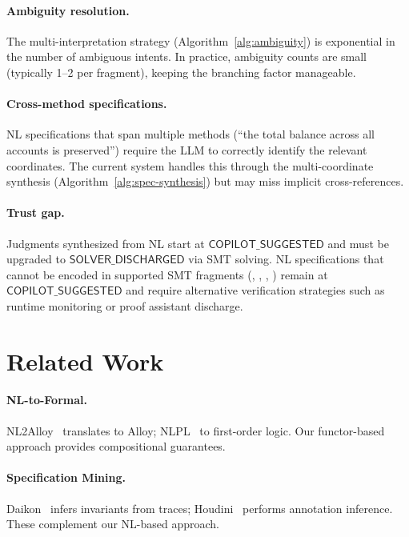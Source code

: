 \documentclass[11pt]{article}
\newcommand{\CopilotSugg}{\mathsf{COPILOT\_SUGGESTED}}
\newcommand{\SolverDisch}{\mathsf{SOLVER\_DISCHARGED}}
\begin{document}
\paragraph{Ambiguity resolution.}
The multi-interpretation strategy
(Algorithm~\ref{alg:ambiguity}) is exponential in the number of
ambiguous intents.  In practice, ambiguity counts are small (typically
1--2 per fragment), keeping the branching factor manageable.

\paragraph{Cross-method specifications.}
NL specifications that span multiple methods (\eg ``the total
balance across all accounts is preserved'') require the LLM to
correctly identify the relevant coordinates.  The current system
handles this through the multi-coordinate synthesis
(Algorithm~\ref{alg:spec-synthesis}) but may miss implicit
cross-references.

\paragraph{Trust gap.}
Judgments synthesized from NL start at $\CopilotSugg$ and must be
upgraded to $\SolverDisch$ via SMT solving.  NL specifications that
cannot be encoded in supported SMT fragments (\QFLIA, \QFLRA, \QFBV,
\QFUF) remain at $\CopilotSugg$ and require alternative verification
strategies such as runtime monitoring or proof assistant discharge.

\section{Related Work}\label{sec:related}

\paragraph{NL-to-Formal.}
NL2Alloy~\cite{Sinha2010} translates to Alloy; NLPL~\cite{Liu2021}
to first-order logic.  Our functor-based approach provides
compositional guarantees.

\paragraph{Specification Mining.}
Daikon~\cite{Ernst2007} infers invariants from traces;
Houdini~\cite{Flanagan2001} performs annotation inference.  These
complement our NL-based approach.
\end{document}
